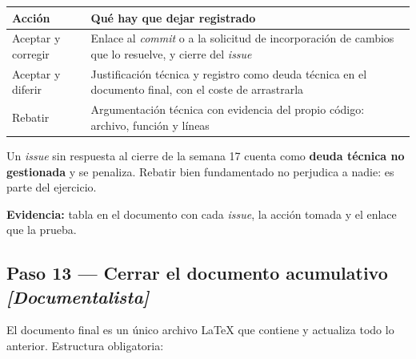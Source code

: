 \documentclass[11pt,a4paper]{article}
\newcommand{\paso}[1]{\subsection{#1}}
\begin{document}
	\begin{center}
		\small
		\begin{tabular}{@{}p{3.6cm}p{11.3cm}@{}}
			\toprule
			\textbf{Acción} & \textbf{Qué hay que dejar registrado} \\
			\midrule
			Aceptar y corregir & Enlace al \emph{commit} o a la solicitud de incorporación de cambios que lo resuelve, y cierre del \emph{issue} \\
			\addlinespace
			Aceptar y diferir & Justificación técnica y registro como deuda técnica en el documento final, con el coste de arrastrarla \\
			\addlinespace
			Rebatir & Argumentación técnica con evidencia del propio código: archivo, función y líneas \\
			\bottomrule
		\end{tabular}
	\end{center}
	
	Un \emph{issue} sin respuesta al cierre de la semana 17 cuenta como \textbf{deuda técnica no gestionada} y se penaliza. Rebatir bien fundamentado no perjudica a nadie: es parte del ejercicio.
	
	\textbf{Evidencia:} tabla en el documento con cada \emph{issue}, la acción tomada y el enlace que la prueba.
	
	\paso{Paso 13 --- Cerrar el documento acumulativo \emph{[Documentalista]}}
	
	El documento final es un único archivo LaTeX que contiene y actualiza todo lo anterior. Estructura obligatoria:
	
\end{document}

